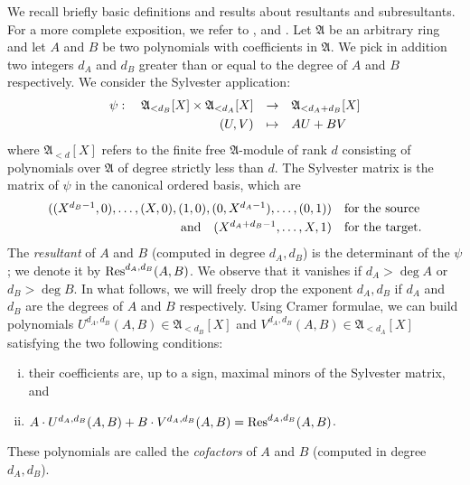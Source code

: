 \documentclass{jT}
\numberwithin{equation}{section}
\theoremstyle{definition}
\newcommand{\ring}{\mathfrak A}
\renewcommand{\Res}{\text{\rm Res}}
\begin{document}
We recall briefly basic definitions and results about resultants and 
subresultants. For a more complete exposition, we refer to \cite[\S 
4.2]{real}, \cite[\S 3.3]{cohen} and \cite[\S 4.1]{winkler}. Let $\ring$ 
be an arbitrary ring and let $A$ and $B$ be two polynomials with 
coefficients in $\ring$. We pick in addition two integers $d_A$ and 
$d_B$ greater than or equal to the degree of $A$ and $B$ respectively. 
We consider the Sylvester application:
$$\begin{array}{rcl}
\psi : \quad
\ring_{< d_B}[X] \times \ring_{< d_A}[X] & \to &
\ring_{< d_A+d_B}[X] \smallskip \\
(U,V) & \mapsto & AU + BV
\end{array}$$
where $\ring_{<d}[X]$ refers to the finite free $\ring$-module of
rank $d$ consisting of polynomials over $\ring$ of degree strictly 
less than $d$.
The Sylvester matrix is the matrix of $\psi$ in the canonical ordered
basis, which are
$$\begin{array}{rl}
((X^{d_B-1},0), \ldots, (X,0), (1,0), (0,X^{d_A-1}), \ldots, (0,1)) &
\text{for the source} \smallskip \\
\text{and} \quad (X^{d_A+d_B-1}, \ldots, X, 1) &
\text{for the target.}
\end{array}$$
The \emph{resultant} of $A$ and $B$ (computed in degree $d_A, d_B$) is the 
determinant of the $\psi$; we denote it by $\Res^{d_A,d_B}(A,B)$. We 
observe that it vanishes if $d_A > \deg A$ or $d_B > \deg B$. In what 
follows, we will freely drop the exponent $d_A, d_B$ if $d_A$ and $d_B$ 
are the degrees of $A$ and $B$ respectively.
Using Cramer formulae, we can build polynomials $U^{d_A, d_B}(A,B) \in
\ring_{< d_B}[X]$ and $V^{d_A, d_B}(A,B) \in \ring_{< d_A}[X]$ 
satisfying the two following conditions:
\begin{enumerate}[i)]
\item their coefficients are, up to a sign, maximal minors of the 
Sylvester matrix, and
\item $A \cdot U^{d_A, d_B}(A,B) + B \cdot V^{d_A, d_B}(A,B) = 
\Res^{d_A, d_B}(A,B)$.
\end{enumerate}
These polynomials are called the \emph{cofactors} of $A$ and $B$
(computed in degree $d_A, d_B$).

\medskip
\end{document}
